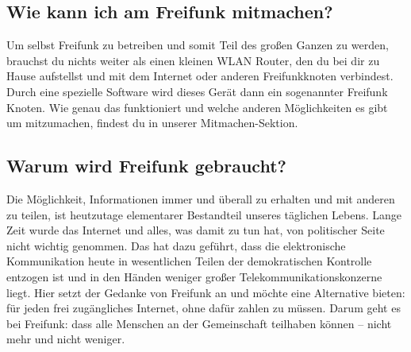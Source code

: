\subsection{Wie kann ich am Freifunk mitmachen?}

Um selbst Freifunk zu betreiben und somit Teil des großen Ganzen zu werden, brauchst du nichts weiter als einen kleinen WLAN Router, den du bei dir zu Hause aufstellst und mit dem Internet oder anderen Freifunkknoten verbindest. Durch eine spezielle Software wird dieses Gerät dann ein sogenannter Freifunk Knoten.
Wie genau das funktioniert und welche anderen Möglichkeiten es gibt um mitzumachen, findest du in unserer Mitmachen-Sektion.

\newpage
\subsection{Warum wird Freifunk gebraucht?}

Die Möglichkeit, Informationen immer und überall zu erhalten und mit anderen zu teilen, ist heutzutage elementarer Bestandteil unseres täglichen Lebens. Lange Zeit wurde das Internet und alles, was damit zu tun hat, von politischer Seite nicht wichtig genommen. Das hat dazu geführt, dass die elektronische Kommunikation heute in wesentlichen Teilen der demokratischen Kontrolle entzogen ist und in den Händen weniger großer Telekommunikationskonzerne liegt. Hier setzt der Gedanke von Freifunk an und möchte eine Alternative bieten: für jeden frei zugängliches Internet, ohne dafür zahlen zu müssen. Darum geht es bei Freifunk: dass alle Menschen an der Gemeinschaft teilhaben können – nicht mehr und nicht weniger.